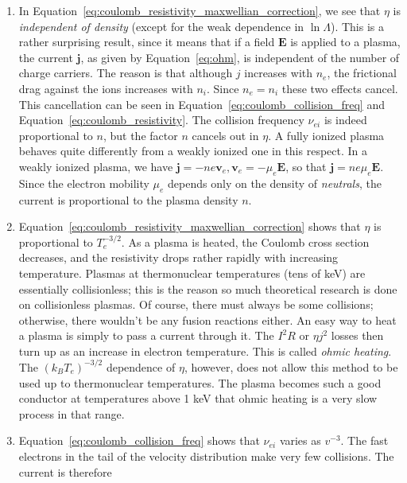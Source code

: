 \documentclass[
  notoc %
]{tufte-book}
\begin{document}
\begin{enumerate}
\def\labelenumi{\arabic{enumi}.}
\item
  In Equation~\ref{eq:coulomb_resistivity_maxwellian_correction}, we see
  that \(\eta\) is \emph{independent of density} (except for the weak
  dependence in \(\ln\Lambda\)). This is a rather surprising result,
  since it means that if a field \(\mathbf{E}\) is applied to a plasma,
  the current \(\mathbf{j}\), as given by Equation~\ref{eq:ohm}, is
  independent of the number of charge carriers. The reason is that
  although \(j\) increases with \(n_e\), the frictional drag against the
  ions increases with \(n_i\). Since \(n_e=n_i\) these two effects
  cancel. This cancellation can be seen in
  Equation~\ref{eq:coulomb_collision_freq} and
  Equation~\ref{eq:coulomb_resistivity}. The collision frequency
  \(\nu_{ei}\) is indeed proportional to \(n\), but the factor \(n\)
  cancels out in \(\eta\). A fully ionized plasma behaves quite
  differently from a weakly ionized one in this respect. In a weakly
  ionized plasma, we have
  \(\mathbf{j}=-ne\mathbf{v}_e,\mathbf{v}_e=-\mu_e\mathbf{E}\), so that
  \(\mathbf{j}=ne\mu_e\mathbf{E}\). Since the electron mobility
  \(\mu_e\) depends only on the density of \emph{neutrals}, the current
  is proportional to the plasma density \(n\).
\item
  Equation~\ref{eq:coulomb_resistivity_maxwellian_correction} shows that
  \(\eta\) is proportional to \(T_e^{-3/2}\). As a plasma is heated, the
  Coulomb cross section decreases, and the resistivity drops rather
  rapidly with increasing temperature. Plasmas at thermonuclear
  temperatures (tens of keV) are essentially collisionless; this is the
  reason so much theoretical research is done on collisionless plasmas.
  Of course, there must always be some collisions; otherwise, there
  wouldn't be any fusion reactions either. An easy way to heat a plasma
  is simply to pass a current through it. The \(I^2R\) or \(\eta j^2\)
  losses then turn up as an increase in electron temperature. This is
  called \emph{ohmic heating}. The \((k_BT_e)^{-3/2}\) dependence of
  \(\eta\), however, does not allow this method to be used up to
  thermonuclear temperatures. The plasma becomes such a good conductor
  at temperatures above 1 keV that ohmic heating is a very slow process
  in that range.
\item
  Equation~\ref{eq:coulomb_collision_freq} shows that \(\nu_{ei}\)
  varies as \(v^{-3}\). The fast electrons in the tail of the velocity
  distribution make very few collisions. The current is therefore

\end{enumerate}
\end{document}
